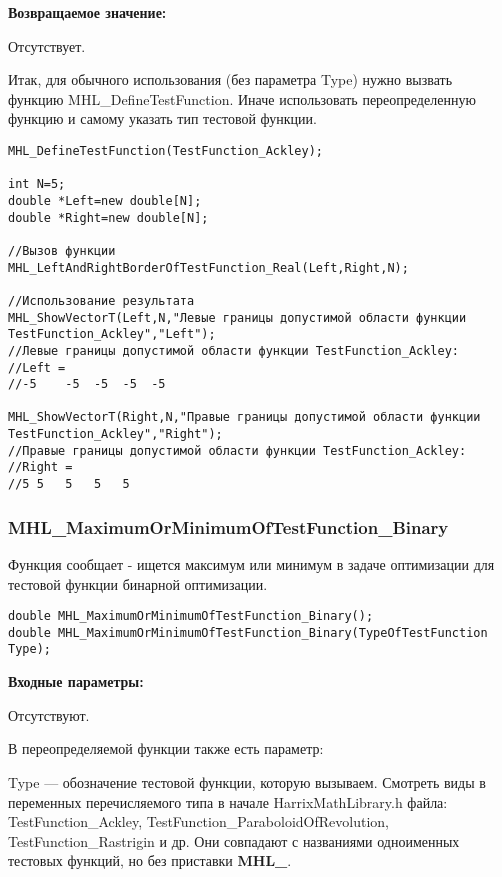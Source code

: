 \documentclass[a4paper,12pt]{article}
\begin{document}
\textbf{Возвращаемое значение:}
 
Отсутствует.

Итак, для обычного использования (без параметра Type) нужно вызвать функцию MHL\_DefineTestFunction. Иначе использовать переопределенную функцию и самому указать тип тестовой функции.


\begin{lstlisting}[label=code_use_MHL_LeftBorderOfTestFunction_Real,caption=Пример использования]
MHL_DefineTestFunction(TestFunction_Ackley);

int N=5;
double *Left=new double[N];
double *Right=new double[N];

//Вызов функции
MHL_LeftAndRightBorderOfTestFunction_Real(Left,Right,N);

//Использование результата
MHL_ShowVectorT(Left,N,"Левые границы допустимой области функции TestFunction_Ackley","Left");
//Левые границы допустимой области функции TestFunction_Ackley:
//Left =	
//-5	-5	-5	-5	-5

MHL_ShowVectorT(Right,N,"Правые границы допустимой области функции TestFunction_Ackley","Right");
//Правые границы допустимой области функции TestFunction_Ackley:
//Right =	
//5	5	5	5	5
\end{lstlisting}

\subsubsection{MHL\_MaximumOrMinimumOfTestFunction\_Binary}\label{MHL_MaximumOrMinimumOfTestFunction_Binary}

	Функция сообщает - ищется максимум или минимум в задаче оптимизации для тестовой функции бинарной оптимизации.


\begin{lstlisting}[label=code_syntax_MHL_MaximumOrMinimumOfTestFunction_Binary,caption=Синтаксис]
double MHL_MaximumOrMinimumOfTestFunction_Binary();
double MHL_MaximumOrMinimumOfTestFunction_Binary(TypeOfTestFunction Type);
\end{lstlisting}

\textbf{Входные параметры:}

Отсутствуют.

В переопределяемой функции также есть параметр:
  
Type --- обозначение тестовой функции, которую вызываем.
Смотреть виды в переменных перечисляемого типа в начале HarrixMathLibrary.h файла: TestFunction\_Ackley, TestFunction\_ParaboloidOfRevolution, TestFunction\_Rastrigin и др. Они совпадают с названиями одноименных тестовых функций, но без приставки \textbf{MHL\_}.
\end{document}
